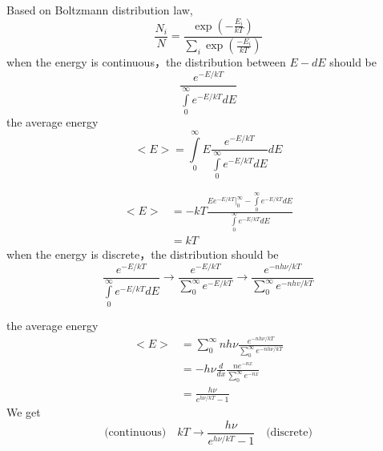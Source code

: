 \begin{frame}
    Based on Boltzmann distribution law,
    \begin{equation*}
        \frac{N_{i}}{N}=\frac{\exp \left(-\frac{E_{i}}{k T}\right)}{\sum_{i} \exp \left(\frac{-E_{i}}{k T}\right)}
    \end{equation*}
    \bullet when the energy is continuous，the distribution between $E - dE$ should be 
    \begin{equation*}
        \frac{e^{-E / k T}}{\int\limits_{0}^{\infty} e^{-E / k T} d E}
    \end{equation*}  
    the average energy 
    \begin{equation*}
        <E>=\int\limits_{0}^{\infty} E \frac{e^{-E / k T}}{\int\limits_{0}^{\infty} e^{-E / k T} d E} d E
    \end{equation*}
\end{frame}

\begin{frame}
    \begin{equation*}
        \begin{split}
            <E> &= -kT \frac{Ee^{-E / k T}\vert_0 ^\infty-\int\limits_{0}^{\infty} e^{-E / k T} d E } {\int\limits_{0}^{\infty} e^{-E / k T} d E }\\  
                &= kT
        \end{split}  
    \end{equation*} 
    \bullet when the energy is discrete，the distribution should be   
    \begin{equation*}
        \frac{e^{-E / k T}}{\int\limits_{0}^{\infty} e^{-E / k T} d E} 
        \to \frac{e^{-E / k T}}{\sum\limits_{0}^{\infty} e^{-E / k T}} 
        \to \frac{e^{-nh\nu / k T}}{\sum\limits_{0}^{\infty} e^{-nhv / k T}} 
    \end{equation*}    
\end{frame}

\begin{frame}
    the average energy 
    \begin{equation*}
        \begin{split}
            <E> &= \sum\limits_{0}^{\infty} nh\nu\frac{e^{-nh\nu / k T}}{\sum\limits_{0}^{\infty} e^{-nh\nu / k T}} \\
            &= -h\nu \frac{d}{dx} \frac{n e^{-nx}}{\sum\limits_{0}^{\infty} e^{-nx}} \\
            &= \frac{h\nu}{e^{h\nu/kT}-1} 
        \end{split} 
    \end{equation*}
    We get
    \begin{equation*}
        \text{(continuous)} \quad k T \rightarrow \frac{h \nu}{e^{ h \nu / k T}-1} \quad \text{(discrete)} 
    \end{equation*}
\end{frame}

